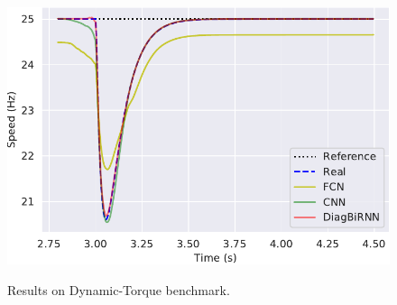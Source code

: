 \documentclass{beamer}
\begin{document}
\begin{frame}
\begin{figure}
    \includegraphics[scale=0.3]{images/bench4_speed.pdf}\\
    \caption{Results on Dynamic-Torque benchmark.}
    \label{fig:dynamictorque}
\end{figure}

\end{frame}
\end{document}
